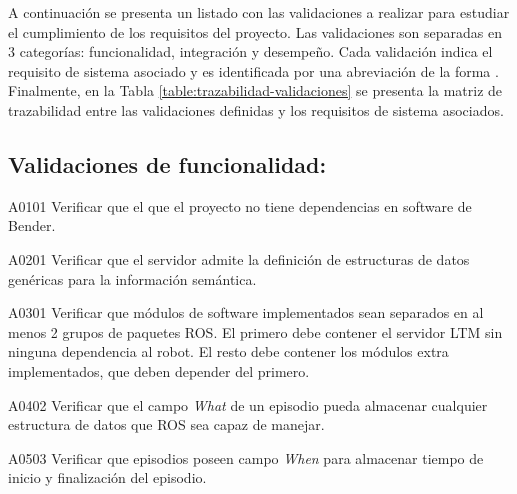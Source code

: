 A continuación se presenta un listado con las validaciones a realizar para estudiar el cumplimiento de los requisitos del proyecto. Las validaciones son separadas en 3 categorías: funcionalidad, integración y desempeño. Cada validación indica el requisito de sistema  asociado y es identificada por una abreviación de la forma . Finalmente, en la Tabla \ref{table:trazabilidad-validaciones} se presenta la matriz de trazabilidad entre las validaciones definidas y los requisitos de sistema asociados.

\newenvironment{def-validacion}[3]
{
	\noindent{\bfseries Validación \Vlabel{#1}{#2}}
	\hfill\textit{(Derivado de }\RSlabel{#3})\\
}{}

\subsection{Validaciones de funcionalidad: }

\begin{def-validacion}{A}{01}{01}
	Verificar que el que el proyecto no tiene dependencias en software de Bender.
\end{def-validacion}

\begin{def-validacion}{A}{02}{01}
	Verificar que el servidor admite la definición de estructuras de datos genéricas para la información semántica.	
\end{def-validacion}

\begin{def-validacion}{A}{03}{01}
	Verificar que módulos de software implementados sean separados en al menos 2 grupos de paquetes ROS. El primero debe contener el servidor LTM sin ninguna dependencia al robot. El resto debe contener los módulos extra implementados, que deben depender del primero.	
\end{def-validacion}

\begin{def-validacion}{A}{04}{02}
Verificar que el campo \textit{What} de un episodio pueda almacenar cualquier estructura de datos que ROS sea capaz de manejar.	
\end{def-validacion}

\begin{def-validacion}{A}{05}{03}
Verificar que episodios poseen campo \textit{When} para almacenar tiempo de inicio y finalización del episodio.	
\end{def-validacion}

